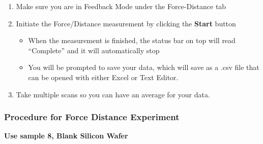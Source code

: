 \documentclass{../lab}
\begin{document}
\begin{enumerate}
    \item Make sure you are in Feedback Mode under the Force-Distance tab
    
    \item Initiate the Force/Distance measurement by clicking the \textbf{Start} button
    \begin{itemize}
        \item When the measurement is finished, the status bar on top will read ``Complete'' and it will automatically stop
        
        \item You will be prompted to save your data, which will save as a .csv file that can be opened with either Excel or Text Editor.
    \end{itemize}
    
    \item Take multiple scans so you can have an average for your data.

\end{enumerate}

\subsubsection{Procedure for Force Distance Experiment}

\textbf{Use sample 8, Blank Silicon Wafer}
\end{document}
